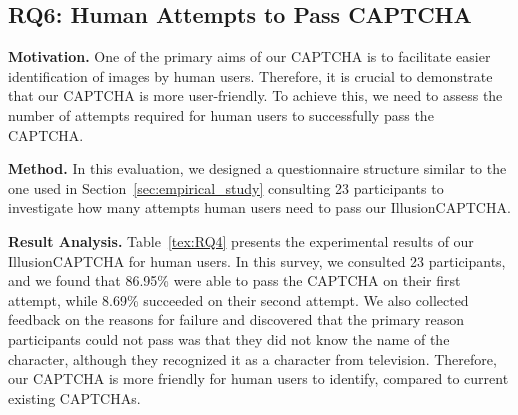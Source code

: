 \subsection{RQ6: Human Attempts to Pass CAPTCHA}

\textbf{Motivation.} One of the primary aims of our CAPTCHA is to facilitate easier identification of images by human users. Therefore, it is crucial to demonstrate that our CAPTCHA is more user-friendly. To achieve this, we need to assess the number of attempts required for human users to successfully pass the CAPTCHA.

\noindent\textbf{Method.} In this evaluation, we designed a questionnaire structure similar to the one used in Section~\ref{sec:empirical_study} consulting 23 participants to investigate how many attempts human users need to pass our IllusionCAPTCHA. 

\noindent\textbf{Result Analysis.} Table~\ref{tex:RQ4} presents the experimental results of our IllusionCAPTCHA for human users. In this survey, we consulted 23 participants, and we found that 86.95\% were able to pass the CAPTCHA on their first attempt, while 8.69\% succeeded on their second attempt. We also collected feedback on the reasons for failure and discovered that the primary reason participants could not pass was that they did not know the name of the character, although they recognized it as a character from television. Therefore, our CAPTCHA is more friendly for human users to identify, compared to current existing CAPTCHAs.

